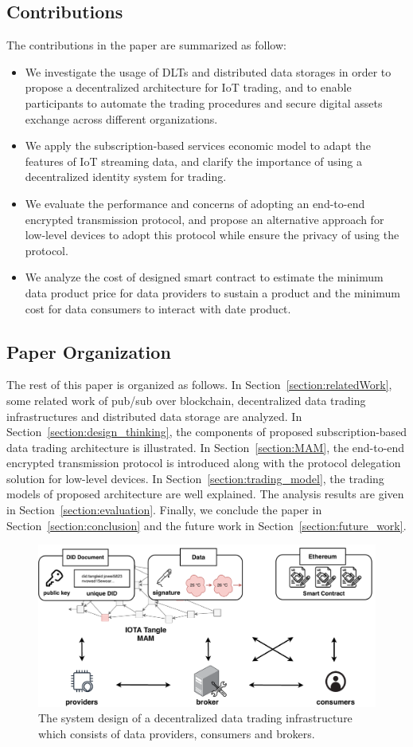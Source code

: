 \documentclass[conference]{IEEEtran}
\begin{document}
\subsection{Contributions}
The contributions in the paper are summarized as follow:
\begin{itemize}
	\item We investigate the usage of DLTs and distributed data storages in order to propose a decentralized architecture for IoT trading, and to enable participants to automate the trading procedures and secure digital assets exchange across different organizations.
	\item We apply the subscription-based services economic model to adapt the features of IoT streaming data, and clarify the importance of using a decentralized identity system for trading.
	\item We evaluate the performance and concerns of adopting an end-to-end encrypted transmission protocol, and propose an alternative approach for low-level devices to adopt this protocol while ensure the privacy of using the protocol.
	\item We analyze the cost of designed smart contract to estimate the minimum data product price for data providers to sustain a product and the minimum cost for data consumers to interact with date product.
\end{itemize}


\subsection{Paper Organization}
The rest of this paper is organized as follows. In Section~\ref{section:relatedWork}, some related work of pub/sub over blockchain, decentralized data trading infrastructures and distributed data storage are analyzed. In Section~\ref{section:design_thinking}, the components of proposed subscription-based data trading architecture is illustrated. In Section~\ref{section:MAM}, the end-to-end encrypted transmission protocol is introduced along with the protocol delegation solution for low-level devices. In Section~\ref{section:trading_model}, the trading models of proposed architecture are well explained. The analysis results are given in Section~\ref{section:evaluation}. Finally, we conclude the paper in Section~\ref{section:conclusion} and the future work in Section~\ref{section:future_work}.

\begin{figure}[!t]
    \centering
    \includegraphics[width=3.in]{system_design}
    \caption{The system design of a decentralized data trading infrastructure which consists of data providers, consumers and brokers.}
    \label{fig:system_design}
\end{figure}
\end{document}
